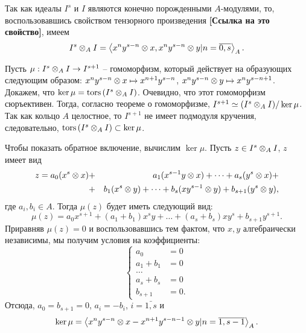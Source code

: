     \begin{Proof}
        Так как идеалы $I^s$ и $I$ являются ко\-неч\-но по\-ро\-жден\-ны\-ми $A$-мо\-ду\-ля\-ми, то, воспользовавшись свойством 
        тензорного произведения \textbf{[Ссылка на это свойство]}, имеем
        \begin{equation*}
            I^s \otimes_A I = \left< x^ny^{s - n} \otimes x, x^ny^{s - n} \otimes y | n = \overline{0, s} \right>_A.
        \end{equation*}
        
        Пусть $\mu : I^s \otimes_A I \rightarrow I^{s + 1}$ -- гомоморфизм, который действует на образующих
        следующим образом: $x^ny^{s - n} \otimes x \mapsto x^{n + 1}y^{s - n}$, 
        $x^ny^{s - n} \otimes y \mapsto x^ny^{s - n + 1}$.
        Докажем, что $\ker \mu = \textup{tors}\left(I^s \otimes_A I\right)$. Очевидно, что этот гомоморфизм сюръективен. Тогда,
        согласно теореме о гомоморфизме, $I^{s + 1} \simeq (I^s \otimes_A I) / \ker \mu$. Так как кольцо
        $A$ целостное, то $I^{s + 1}$ не имеет подмодуля кручения, следовательно, 
        $\textup{tors}\left(I^s \otimes_A I\right) \subset \ker \mu$.

        Чтобы показать обратное включение, вычислим $\ker \mu$. Пусть $z \in I^s \otimes_A I$, $z$
        имеет вид
        \begin{eqnarray*}
            z = a_0(x^s \otimes x) &+& a_1(x^{s - 1}y \otimes x) + \dots + a_s(y^s \otimes x) + \\
                               &+& b_1(x^{s} \otimes y) + \dots + b_s(xy^{s - 1} \otimes y) + 
                               b_{s + 1}(y^s \otimes y),
        \end{eqnarray*}
        где $a_i, b_i \in A$. Тогда $\mu(z)$ будет иметь следующий вид:
        \begin{equation*}
            \mu(z) = a_0x^{s + 1} + (a_1 + b_1)x^sy + \dots + (a_s + b_s)xy^{s} + b_{s + 1}y^{s + 1}.
        \end{equation*}
        Приравняв $\mu(z) = 0$ и воспользовавшись тем фактом, что $x, y$ алгебраически независимы,
        мы получим условия на коэффициенты:
        \begin{equation*}
            \begin{cases}
                a_0 &= 0\\
                a_1 + b_1 &= 0\\
                \dots \\
                a_s + b_s &= 0\\
                b_{s + 1} &= 0.
            \end{cases}
        \end{equation*}
        Отсюда, $a_0 = b_{s + 1} = 0$, $a_i = -b_i$, $i = \bar{1, s}$ и 
        \begin{equation*}
            \ker \mu = \left< x^ny^{s - n} \otimes x - x^{n + 1}y^{s - n - 1} \otimes y |
            n = \overline{1, s-1}\right>_A.
        \end{equation*}
         

\end{Proof}
